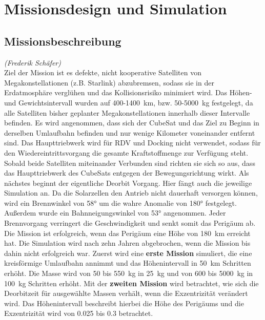 \chapter{Missionsdesign und Simulation}


\section{Missionsbeschreibung}
\hfill\emph{(Frederik Schäfer)}\\
Ziel der Mission ist es defekte, nicht kooperative Satelliten von Megakonstellationen (z.B. Starlink) abzubremsen, sodass sie in der Erdatmosphäre verglühen und das Kollisionsrisiko minimiert wird. Das Höhen- und Gewichtsintervall wurden auf \num{400}-\SI{1400}{\kilo\metre}, bzw. \num{50}-\SI{5000}{\kilogram} festgelegt, da alle Satelliten bisher geplanter Megakonstellationen innerhalb dieser Intervalle befinden.
Es wird angenommen, dass sich der CubeSat und das Ziel zu Beginn in derselben Umlaufbahn befinden und nur wenige Kilometer voneinander entfernt sind. Das Haupttriebwerk wird für RDV und Docking nicht verwendet, sodass für den Wiedereintrittsvorgang die gesamte Kraftstoffmenge zur Verfügung steht. Sobald beide Satelliten miteinander Verbunden sind richten sie sich so aus, dass das Haupttriebwerk des CubeSats entgegen der Bewegungsrichtung wirkt. Als nächstes beginnt der eigentliche Deorbit Vorgang. Hier fängt auch die jeweilige Simulation an. Da die Solarzellen den Antrieb nicht dauerhaft versorgen können, wird ein Brennwinkel von \num{58}° um die wahre Anomalie von \num{180}° festgelegt. Außerdem wurde ein Bahnneigungswinkel von \num{53}° angenommen.
Jeder Brennvorgang verringert die Geschwindigkeit und senkt somit das Perigäum ab. Die Mission ist erfolgreich, wenn das Perigäum eine Höhe von \SI{180}{\kilo\metre} erreicht hat. Die Simulation wird nach zehn Jahren abgebrochen, wenn die Mission bis dahin nicht erfolgreich war. 
Zuerst wird eine \textbf{erste Mission} simuliert, die eine kreisförmige Umlaufbahn annimmt und das Höhenintervall in \SI{50}{\kilo\metre} Schritten erhöht. Die Masse wird von \num{50} bis \SI{550}{\kilogram} in \SI{25}{\kilogram} und von \num{600} bis \SI{5000}{\kilogram} in \SI{100}{\kilogram} Schritten erhöht.
Mit der \textbf{zweiten Mission} wird betrachtet, wie sich die Deorbitzeit für ausgewählte Massen verhält, wenn die Exzentrizität verändert wird. Das Höhenintervall beschreibt hierbei die Höhe des Perigäums und die Exzentrizität wird von \num{0.025} bis \num{0.3} betrachtet.
	
